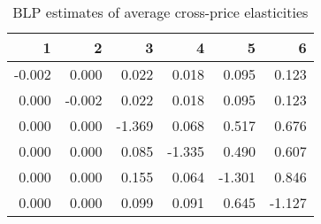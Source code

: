 \begin{table}
\centering
\caption{ BLP estimates of average cross-price elasticities}
\label{tab:blpElasticities}
\begin{tabular}{rrrrrr}
\toprule
     1 &      2 &      3 &      4 &      5 &      6 \\
\midrule
-0.002 &  0.000 &  0.022 &  0.018 &  0.095 &  0.123 \\
 0.000 & -0.002 &  0.022 &  0.018 &  0.095 &  0.123 \\
 0.000 &  0.000 & -1.369 &  0.068 &  0.517 &  0.676 \\
 0.000 &  0.000 &  0.085 & -1.335 &  0.490 &  0.607 \\
 0.000 &  0.000 &  0.155 &  0.064 & -1.301 &  0.846 \\
 0.000 &  0.000 &  0.099 &  0.091 &  0.645 & -1.127 \\
\bottomrule
\end{tabular}
\end{table}
